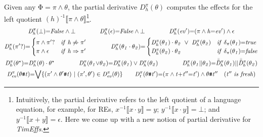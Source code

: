 \documentclass[acmsmall,10pt,review]{acmart}
\newcommand{\env}{\code{\mathcal{V}}}
\newcommand{\es}{\theta}
\newcommand{\ev}{ev}
\newcommand{\timedEffects}{\emph{TimEffs}}
\newcommand{\effect}{{\ensuremath{\mathrm{\Phi}}}}
\newcommand{\code}[1]{{\tt{\ensuremath{\m{#1}}}}}
\newcommand{\m}{\mathit}
\newcommand{\mysharp}{{\mathrel{\texttt{\#}}}}
\begin{document}
{\vspace{2mm}
\begin{definition}\label{Derivative}
  Given any \code{\effect {=}\pi \wedge  \es}, 
  the partial derivative \code{D^{\pi}_{h}( \es)} 
   computes the  effects for the 
  left quotient \code{(h)^{\text{-}1}\llbracket \pi \wedge \es 
  \rrbracket}\footnote{Intuitively, the partial derivative refers to the left quotient of a language equation, for example, for REs, \code{x^{{-}1} \llbracket x\cdot y\rrbracket {=} y};  \code{y^{{-}1} \llbracket x\cdot y\rrbracket {=} \bot }; and  \code{y^{{-}1} \llbracket x + y\rrbracket {=} \epsilon}. Here we come up with a new notion of partial derivative for \timedEffects. 
  }. 
  \begin{gather*}
  \code{D^{\pi}_{h}( \bot ) {=}}  \code{False \wedge \bot } 
  \qquad\qquad 
  \code{D^{\pi}_{h}(   \epsilon) {=}}  \code{False \wedge \bot } 
  \qquad\qquad
  \code{D^{\pi}_{h}(  \ev^\prime) } {=} 
  \code{  (\pi \wedge h{=}\ev^\prime) \wedge \epsilon} 
  \\
  {
   \code{\code{D^{\pi}_{h}( \pi^\prime?)} {=}}
  \begin{cases}
        \code{\pi \wedge \pi^\prime? } &\code{if\ h \not\Rightarrow  \pi^\prime}   \\
        \code{\pi \wedge \epsilon} & \code{if\ h \Rightarrow \pi^\prime} 
      \end{cases} 
      }
      \qquad \quad \ \ \ 
  {
   \code{D^{\pi}_{h}( \es_1  \cdot  \es_2) {=} }
  \begin{cases}
        \code{D^{\pi}_{h}( \es_1) \cdot  \es_2\ \vee \  D^{\pi}_{h}( \es_2)}  &\code{if\ \delta_{\pi}(\es_1) {=} true}   \\
        \code{D^{\pi}_{h}( \es_2) \cdot  \es_2} & \code{if\ \delta_{\pi}(\es_1) {=} false} 
      \end{cases} 
      }
  \\
  \code{D^{\pi}_{h}(  {\es^\star}) } {=} \code{ D^{\pi}_{h}(  {\es}) \cdot {\es^\star}}  
  \qquad\quad \ \ \ 
  \code{D^{\pi}_{h}(  \es_1 {\vee} \es_2) } {=} \code{ D^{\pi}_{h}(  \es_1) \vee D^{\pi}_{h}(  \es_2)} 
  \qquad \quad\ \ \ 
  \code{D^{\pi}_{h}( \es_1 {||}\es_2)} {=} \code{\Bar{\Bar{D}}^{\pi}_{h}( \es_1)} || \code{\Bar{\Bar{D}}^{\pi}_{h}( \es_2)} 
   \\
   \code{D^{\pi}_{\ev}(  \es \mysharp t) } {=} {\bigvee}
   \code{ \{ (\pi^\prime \wedge \es^\prime  \mysharp t) \ | \ (\pi^\prime, \es^\prime) \in D^{\pi}_{\ev}(\es) \} } 
\qquad 
   \code{D^{\pi}_{t}(  \es \mysharp t^\prime) } {=} 
   \code{ (\pi \wedge t{+}t^{\prime\prime}{=}t^\prime) \wedge  
   \es \mysharp t^{\prime\prime} \ \ \  {(t^{\prime\prime}\ is\ fresh)} } 
  \end{gather*}
  \end{definition}
  
}
\end{document}
